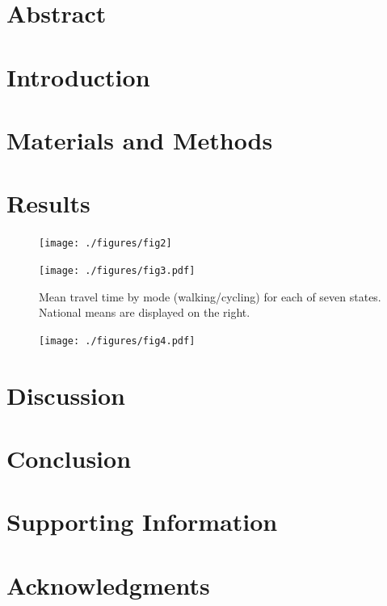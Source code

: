 \documentclass[10pt,letterpaper]{article}
\begin{document}
\section*{Abstract}


% 

\linenumbers

\section*{Introduction}


\section*{Materials and Methods}


\section*{Results}
\begin{figure}[t]
    \centerline{\texttt{[image: ./figures/fig2]}}
    \caption{}\label{dalyFigure}
\end{figure}

\begin{figure}[t]
  \centerline{\texttt{[image: ./figures/fig3.pdf]}}
    \caption{Mean travel time by mode (walking/cycling) for each of
      seven states.  National means are displayed on the
      right.}\label{meanMatrices}
\end{figure}

\begin{figure}[t]
  \centerline{\texttt{[image: ./figures/fig4.pdf]}}
    \caption{}\label{California}
\end{figure}



\section*{Discussion}


\section*{Conclusion}


\section*{Supporting Information}



\section*{Acknowledgments}

\nolinenumbers


\end{document}
